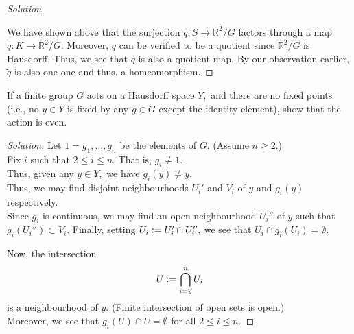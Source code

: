 \documentclass[12pt]{article}
\newenvironment{soln}{\begin{proof}[Solution]}{\end{proof}}
\begin{document}
\begin{soln}
\begin{center}
		\end{center}
		We have shown above that the surjection $q:S\to \mathbb{R}^2/G$ factors through a map $\tilde{q}:K \to \mathbb{R}^2/G.$ Moreover, $q$ can be verified to be a quotient since $\mathbb{R}^2/G$ is Hausdorff. Thus, we see that $\tilde{q}$ is also a quotient map. By our observation earlier, $\tilde{q}$ is also one-one and thus, a homeomorphism.
\end{soln}
%
\begin{exe} \label{exe:finitehausdiscontaction}
	If a finite group $G$ acts on a Hausdorff space $Y,$ and there are no fixed points (i.e., no $y \in Y$ is fixed by any $g \in G$ except the identity element), show that the action is even.
\end{exe}
\begin{soln}
	Let $1 = g_1, \ldots, g_n$ be the elements of $G.$ (Assume $n \ge 2.$) \\
	Fix $i$ such that $2 \le i \le n.$ That is, $g_i \neq 1.$\\
	Thus, given any $y \in Y,$ we have $g_i(y) \neq y.$\\
	Thus, we may find disjoint neighbourhoods $U_i'$ and $V_i$ of $y$ and $g_i(y)$ respectively.\\
	Since $g_i$ is continuous, we may find an open neighbourhood $U_i''$ of $y$ such that $g_i(U_i'') \subset V_i.$ Finally, setting $U_i\vcentcolon= U_i'\cap U_i'',$ we see that $U_i \cap g_i(U_i) = \emptyset.$

	Now, the intersection
	\begin{equation*} 
		U \vcentcolon= \bigcap_{i = 2}^n U_i
	\end{equation*}
	is a neighbourhood of $y.$ (Finite intersection of open sets is open.)\\
	Moreover, we see that $g_i(U) \cap U = \emptyset$ for all $2 \le i \le n.$
\end{soln}
\end{document}
